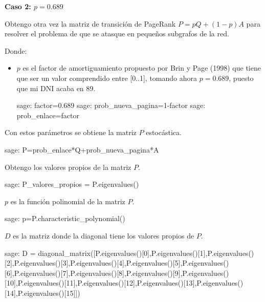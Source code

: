 \par\textbf{Caso 2: $p = 0.689$}
\par Obtengo otra vez la matriz de transición de PageRank $P=pQ + (1-p)A$ para resolver el 
problema de que se atasque en pequeños subgrafos de la red.
\par Donde:
\begin{itemize}
    \item $p$ es el factor de amortiguamiento propuesto por Brin y Page (1998) que tiene que ser un valor 
    comprendido entre [0..1], tomando ahora $p = 0.689$, puesto que mi DNI acaba en 89.
    \begin{sagecommandline}
        sage: factor=0.689
        sage: prob_nueva_pagina=1-factor
        sage: prob_enlace=factor
    \end{sagecommandline}
\end{itemize}

\par Con estos parámetros se obtiene la matriz $P$ estocástica.
\begin{sagecommandline}
    sage: P=prob_enlace*Q+prob_nueva_pagina*A
\end{sagecommandline}

\par Obtengo los valores propios de la matriz $P$.
\begin{sagecommandline}
    sage: P_valores_propios = P.eigenvalues()
\end{sagecommandline}
\par $p$ es la función polinomial de la matriz $P$.
\begin{sagecommandline}
    sage: p=P.characteristic_polynomial()
\end{sagecommandline}
\par $D$ es la matriz donde la diagonal tiene los valores propios de $P$.
\begin{sagecommandline}
    sage: D = diagonal_matrix([P.eigenvalues()[0],P.eigenvalues()[1],P.eigenvalues()[2],P.eigenvalues()[3],P.eigenvalues()[4],P.eigenvalues()[5],P.eigenvalues()[6],P.eigenvalues()[7],P.eigenvalues()[8],P.eigenvalues()[9],P.eigenvalues()[10],P.eigenvalues()[11],P.eigenvalues()[12],P.eigenvalues()[13],P.eigenvalues()[14],P.eigenvalues()[15]])
\end{sagecommandline}

